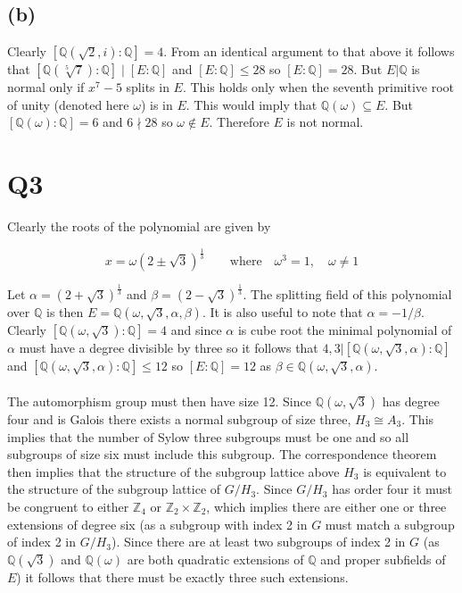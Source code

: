 \documentclass{article}
\begin{document}
\subsection*{(b)}
Clearly $[\mathbb{Q}(\sqrt{2},i):\mathbb{Q}] = 4$. From an identical argument to that above 
it follows that $[\mathbb{Q}(\sqrt[5]{7}):\mathbb{Q}]\mid[E:\mathbb{Q}]$ and $[E:\mathbb{Q}] \leq 28$ 
so $[E:\mathbb{Q}] = 28$. But $E|\mathbb{Q}$ is normal only if $x^7-5$ splits in $E$. This holds 
only when the seventh primitive root of unity (denoted here $\omega$) is in $E$. This would 
imply that $\mathbb{Q}(\omega) \subseteq E$. But $[\mathbb{Q}(\omega):\mathbb{Q}] = 6$ and 
$6 \nmid 28$ so $\omega \notin E$. Therefore $E$ is not normal.

\section*{Q3}
Clearly the roots of the polynomial are given by 

\begin{equation*}
    x = \omega(2\pm \sqrt{3})^\frac{1}{3} \qquad \text{where} \quad \omega^3=1,\quad \omega \neq 1
\end{equation*}

Let $\alpha = (2 + \sqrt{3})^{\frac{1}{3}}$ and $\beta = (2-\sqrt{3})^{\frac{1}{3}}$. The splitting 
field of this polynomial over $\mathbb{Q}$ is then $E = \mathbb{Q}(\omega,\sqrt{3},\alpha,\beta)$. It is 
also useful to note that $\alpha = -1/\beta$. Clearly $[\mathbb{Q}(\omega,\sqrt{3}):\mathbb{Q}] = 4$ 
and since $\alpha$ is cube root the minimal polynomial of $\alpha$ must have a degree divisible by three so it follows that $4,3|[\mathbb{Q}(\omega,\sqrt{3},\alpha):\mathbb{Q}]$ 
and $[\mathbb{Q}(\omega,\sqrt{3},\alpha):\mathbb{Q}] \leq 12$ so $[E:\mathbb{Q}] = 12$ as $\beta \in \mathbb{Q}(\omega,\sqrt{3},\alpha)$. 

\paragraph{}
The automorphism group must then have size 12. Since $\mathbb{Q}(\omega,\sqrt{3})$ has degree 
four and is Galois there exists a normal subgroup of size three, $H_3 \cong A_3$. This implies that the 
number of Sylow three subgroups must be one and so all subgroups of size six must include this 
subgroup. The correspondence theorem 
then implies that the structure of the subgroup lattice above $H_3$ is equivalent to the structure 
of the subgroup lattice of $G/H_3$. Since $G/H_3$ has order four it must be congruent to either 
$\mathbb{Z}_4$ or $\mathbb{Z}_2 \times \mathbb{Z}_2$, which implies there are either 
one or three extensions of degree six (as a subgroup with index 2 in $G$ must match a subgroup of 
index 2 in $G/H_3$). Since there are at least two subgroups of index 2 in $G$ (as $\mathbb{Q}(\sqrt{3})$ 
and $\mathbb{Q}(\omega)$ are both quadratic extensions of $\mathbb{Q}$ and proper subfields of $E$) 
it follows that there must be exactly three such extensions. 
\end{document}
